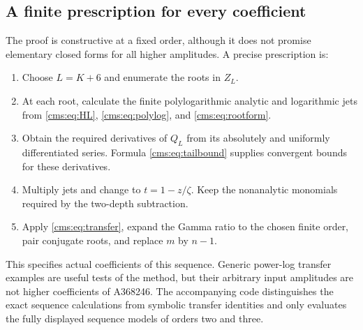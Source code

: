 \subsection{A finite prescription for every coefficient}
The proof is constructive at a fixed order, although it does not promise elementary closed forms for all higher amplitudes. A precise prescription is:
\begin{enumerate}
\item Choose $L=K+6$ and enumerate the roots in $Z_L$.
\item At each root, calculate the finite polylogarithmic analytic and logarithmic jets from \eqref{cms:eq:HL}, \eqref{cms:eq:polylog}, and \eqref{cms:eq:rootform}.
\item Obtain the required derivatives of $Q_L$ from its absolutely and uniformly differentiated series. Formula \eqref{cms:eq:tailbound} supplies convergent bounds for these derivatives.
\item Multiply jets and change to $t=1-z/\zeta$. Keep the nonanalytic monomials required by the two-depth subtraction.
\item Apply \eqref{cms:eq:transfer}, expand the Gamma ratio to the chosen finite order, pair conjugate roots, and replace $m$ by $n-1$.
\end{enumerate}
This specifies actual coefficients of this sequence. Generic power-log transfer examples are useful tests of the method, but their arbitrary input amplitudes are not higher coefficients of A368246. The accompanying code distinguishes the exact sequence calculations from symbolic transfer identities and only evaluates the fully displayed sequence models of orders two and three.
